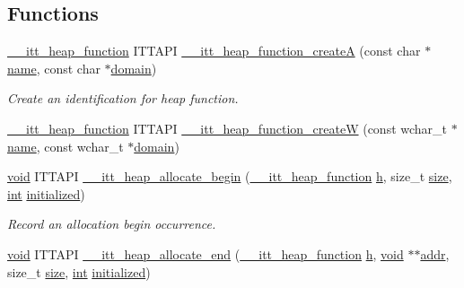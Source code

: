 \subsection*{Functions}
\begin{DoxyCompactItemize}
\item 
\hyperlink{group__heap_ga3907115617c96d09c646554d1a386bdf}{\-\_\-\-\_\-itt\-\_\-heap\-\_\-function} I\-T\-T\-A\-P\-I \hyperlink{group__heap_gabbde8e9d232ceaf48c90adad4c1ce233}{\-\_\-\-\_\-itt\-\_\-heap\-\_\-function\-\_\-create\-A} (const char $\ast$\hyperlink{ittnotify__static_8h_a1c34b35a4952969fef60192313bba34a}{name}, const char $\ast$\hyperlink{ittnotify__static_8h_ae4bc3459cfd348603d57d87ede15591b}{domain})
\begin{DoxyCompactList}\small\item\em Create an identification for heap function. \end{DoxyCompactList}\item 
\hyperlink{group__heap_ga3907115617c96d09c646554d1a386bdf}{\-\_\-\-\_\-itt\-\_\-heap\-\_\-function} I\-T\-T\-A\-P\-I \hyperlink{group__heap_ga90fea265a5509cd00e053d9b0d0ba020}{\-\_\-\-\_\-itt\-\_\-heap\-\_\-function\-\_\-create\-W} (const wchar\-\_\-t $\ast$\hyperlink{ittnotify__static_8h_a1c34b35a4952969fef60192313bba34a}{name}, const wchar\-\_\-t $\ast$\hyperlink{ittnotify__static_8h_ae4bc3459cfd348603d57d87ede15591b}{domain})
\item 
\hyperlink{ittnotify__static_8h_af941d56e55e3c5465135b60c4d6343ed}{void} I\-T\-T\-A\-P\-I \hyperlink{group__heap_gaf925d76e7660314a9f5bc10420053d28}{\-\_\-\-\_\-itt\-\_\-heap\-\_\-allocate\-\_\-begin} (\hyperlink{group__heap_ga3907115617c96d09c646554d1a386bdf}{\-\_\-\-\_\-itt\-\_\-heap\-\_\-function} \hyperlink{ittnotify__static_8h_a9de23e959c2bd79e141842a0025bfef1}{h}, size\-\_\-t \hyperlink{ittnotify__static_8h_a5a1daa0c1d342747e3884fa54fc64fb1}{size}, \hyperlink{ittnotify__static_8h_a8b8dcd723308a8cb5d84277c7a3fff70}{int} \hyperlink{ittnotify__static_8h_a181e12fe220d6a81f1647c5a39479f8d}{initialized})
\begin{DoxyCompactList}\small\item\em Record an allocation begin occurrence. \end{DoxyCompactList}\item 
\hyperlink{ittnotify__static_8h_af941d56e55e3c5465135b60c4d6343ed}{void} I\-T\-T\-A\-P\-I \hyperlink{group__heap_ga28f07d01cc3333fa5e98531585a1b5d0}{\-\_\-\-\_\-itt\-\_\-heap\-\_\-allocate\-\_\-end} (\hyperlink{group__heap_ga3907115617c96d09c646554d1a386bdf}{\-\_\-\-\_\-itt\-\_\-heap\-\_\-function} \hyperlink{ittnotify__static_8h_a9de23e959c2bd79e141842a0025bfef1}{h}, \hyperlink{ittnotify__static_8h_af941d56e55e3c5465135b60c4d6343ed}{void} $\ast$$\ast$\hyperlink{ittnotify__static_8h_a7e21c61c16fffcc27199a9d66ff39ab8}{addr}, size\-\_\-t \hyperlink{ittnotify__static_8h_a5a1daa0c1d342747e3884fa54fc64fb1}{size}, \hyperlink{ittnotify__static_8h_a8b8dcd723308a8cb5d84277c7a3fff70}{int} \hyperlink{ittnotify__static_8h_a181e12fe220d6a81f1647c5a39479f8d}{initialized})
$$
\end{DoxyCompactItemize}
